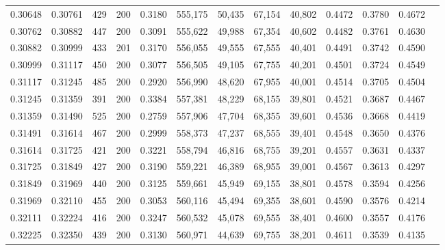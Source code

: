 \begin{tabular}{rrrrrrrrrrrrr}
0.30648 & 0.30761 &    429 & 200 &                                     0.3180 & 555,175 &  50,435 &  67,154 &  40,802 & 0.4472 & 0.3780 & 0.4672 \\
0.30762 & 0.30882 &    447 & 200 &                                     0.3091 & 555,622 &  49,988 &  67,354 &  40,602 & 0.4482 & 0.3761 & 0.4630 \\
0.30882 & 0.30999 &    433 & 201 &                                     0.3170 & 556,055 &  49,555 &  67,555 &  40,401 & 0.4491 & 0.3742 & 0.4590 \\
0.30999 & 0.31117 &    450 & 200 &                                     0.3077 & 556,505 &  49,105 &  67,755 &  40,201 & 0.4501 & 0.3724 & 0.4549 \\
0.31117 & 0.31245 &    485 & 200 &                                     0.2920 & 556,990 &  48,620 &  67,955 &  40,001 & 0.4514 & 0.3705 & 0.4504 \\
0.31245 & 0.31359 &    391 & 200 &                                     0.3384 & 557,381 &  48,229 &  68,155 &  39,801 & 0.4521 & 0.3687 & 0.4467 \\
0.31359 & 0.31490 &    525 & 200 &                                     0.2759 & 557,906 &  47,704 &  68,355 &  39,601 & 0.4536 & 0.3668 & 0.4419 \\
0.31491 & 0.31614 &    467 & 200 &                                     0.2999 & 558,373 &  47,237 &  68,555 &  39,401 & 0.4548 & 0.3650 & 0.4376 \\
0.31614 & 0.31725 &    421 & 200 &                                     0.3221 & 558,794 &  46,816 &  68,755 &  39,201 & 0.4557 & 0.3631 & 0.4337 \\
0.31725 & 0.31849 &    427 & 200 &                                     0.3190 & 559,221 &  46,389 &  68,955 &  39,001 & 0.4567 & 0.3613 & 0.4297 \\
0.31849 & 0.31969 &    440 & 200 &                                     0.3125 & 559,661 &  45,949 &  69,155 &  38,801 & 0.4578 & 0.3594 & 0.4256 \\
0.31969 & 0.32110 &    455 & 200 &                                     0.3053 & 560,116 &  45,494 &  69,355 &  38,601 & 0.4590 & 0.3576 & 0.4214 \\
0.32111 & 0.32224 &    416 & 200 &                                     0.3247 & 560,532 &  45,078 &  69,555 &  38,401 & 0.4600 & 0.3557 & 0.4176 \\
0.32225 & 0.32350 &    439 & 200 &                                     0.3130 & 560,971 &  44,639 &  69,755 &  38,201 & 0.4611 & 0.3539 & 0.4135 \\

\end{tabular}
